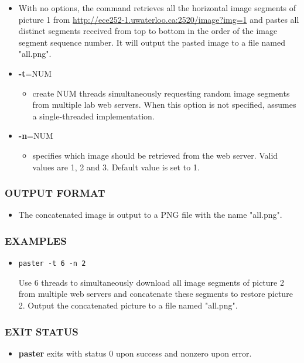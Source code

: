 \begin{itemize}
\item []
  With no options, the command retrieves all the horizontal image segments of picture 1 from \url{http://ece252-1.uwaterloo.ca:2520/image?img=1} and pastes all distinct segments received from top to bottom in the order of the image segment sequence number. It will output the pasted image to a file named "all.png".
\item[] {\bf -t}=NUM
  \begin{itemize}
  \item[] create NUM threads simultaneously requesting random image segments from multiple lab web servers. When this option is not specified, assumes a single-threaded implementation.
  \end{itemize}
\item[] {\bf -n}=NUM
  \begin{itemize}
  \item[] specifies which image should be retrieved from the web server. Valid values are 1, 2 and 3. Default value is set to 1.
  \end{itemize}
\end{itemize}
\subsubsection*{OUTPUT FORMAT}
\begin{itemize}
\item[] The concatenated image is output to a PNG file with the name "all.png". 
\end{itemize}

\subsubsection*{EXAMPLES}
\begin{itemize}
\item[]
\begin{verbatim}
paster -t 6 -n 2
\end{verbatim}
Use 6 threads to simultaneously download all image segments of picture 2 from multiple web servers and concatenate these segments to restore picture 2. Output the concatenated picture to a file named "all.png". 
\end{itemize}

\subsubsection*{EXIT STATUS}
\begin{itemize}
\item[]
  {\bf paster} exits with status 0 upon success and nonzero upon error.
\end{itemize}

